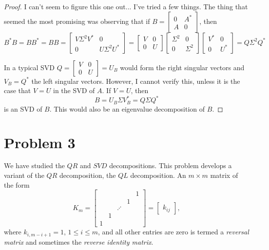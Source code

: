\documentclass{article}
\begin{document}
\begin{proof}
    I can't seem to figure this one out... I've tried a few things. The thing that seemed the most promising was observing that if $B = \begin{bmatrix}
        0 & A^*\\
        A & 0
    \end{bmatrix}$, then
    \[
        B^*B = BB^* = BB = \begin{bmatrix}
            V\Sigma^2V^* & 0\\
            0 & U\Sigma^2 U^*
        \end{bmatrix} = \begin{bmatrix}
            V & 0\\
            0 & U
        \end{bmatrix}
        \begin{bmatrix}
            \Sigma^2 & 0\\
            0 & \Sigma^2
        \end{bmatrix}
        \begin{bmatrix}
            V^* & 0\\
            0 & U^*
        \end{bmatrix}
        =
        Q\Sigma^2Q^*
    \]

    In a typical SVD $Q = \begin{bmatrix}
        V & 0 \\
        0 & U
    \end{bmatrix} = U_B$ would form the right singular vectors and $V_B = Q^*$ the left singular vectors. However, I cannot verify this, unless it is the case that $V=U$ in the SVD of $A$. If $V=U$, then 
    \[
        B = U_B \Sigma V_B^* = Q \Sigma Q^*
    \]
    is an SVD of $B$. This would also be an eigenvalue decomposition of $B$.
    
\end{proof}

\pagebreak

\section*{Problem 3}
We have studied the $QR$ and $SVD$ decompositions. This problem develops a variant of the $QR$ decomposition, the $QL$ decomposition. An $m \times m$ matrix of the form
\[
    K_m = 
    \begin{bmatrix}
        & & & & 1\\
        & & & 1 & \\
        & & \iddots & & \\
        & 1 & & & \\
        1 & & & &
    \end{bmatrix}
    =
    \begin{bmatrix}
        k_{ij}
    \end{bmatrix},    
\]
where $k_{i, m-i+1} = 1$, $1 \leq i \leq m$, and all other entries are zero is termed a \textit{reversal matrix} and sometimes the \textit{reverse identity matrix}. 
\end{document}
